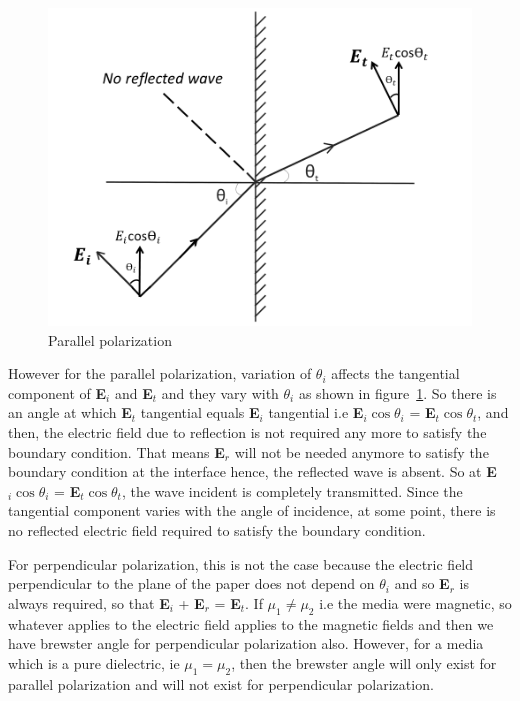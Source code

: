 \begin{figure}[h]
\centering
\includegraphics[width=1\linewidth]{./graphics/No_reflection}
\caption{Parallel polarization}
\label{fig:mcben2}
\end{figure}	

However for the parallel polarization, variation of $\theta_i$ affects the tangential component of \textbf{E}$_i$ and \textbf{E}$_t$ and they vary with $\theta_i$ as shown in figure~\ref{fig:mcben2}. So there is an angle at which \textbf{E}$_t$ tangential equals \textbf{E}$_i$ tangential i.e \textbf{E}$_i\cos\theta_i$ = \textbf{E}$_t\cos\theta_t$, and then, the electric field due to reflection is not required any more to satisfy the boundary condition. That means \textbf{E}$_r$ will not be needed anymore to satisfy the boundary condition at the interface hence, the reflected wave is absent. So at \textbf{E}$_i\cos\theta_i$ = \textbf{E}$_t\cos\theta_t$, the wave incident is completely transmitted. Since the tangential component varies with the angle of incidence, at some point, there is no reflected electric field required to satisfy the boundary condition.

For perpendicular polarization, this is not the case because the electric field perpendicular to the plane of the paper does not depend on $\theta_i$ and so \textbf{E}$_r$ is always required, so that \textbf{E}$_i$ + \textbf{E}$_r$ = \textbf{E}$_t$. If $\mu_1 \neq \mu_2$ i.e the media were magnetic, so whatever applies to the electric field applies to the magnetic fields and then we have brewster angle for perpendicular polarization also. However, for a media which is a pure dielectric, ie $\mu_1 = \mu_2$, then the brewster angle will only exist for parallel polarization and will not exist for perpendicular polarization.


